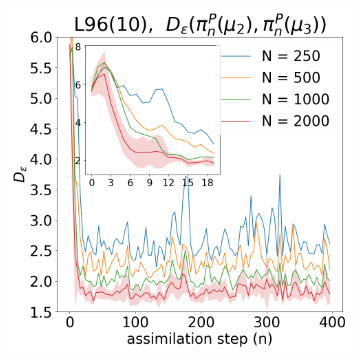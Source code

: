 \begin{figure}[!t]
\begin{subfigure}{0.3\textwidth}
\end{subfigure}\hspace{0mm}%
\begin{subfigure}{0.3\textwidth}
\includegraphics[width=\columnwidth]{numerical-fs/plots/figures-BPF-L96_10-1-dist_2_vs_3.png}
\end{subfigure}\hspace{0mm}%


\end{figure}
